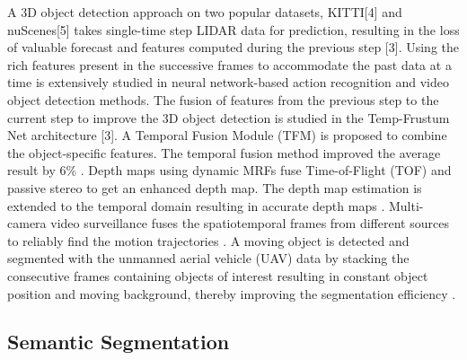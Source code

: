 	A 3D object detection approach on two popular datasets, KITTI[4] and nuScenes[5] takes single-time step LIDAR data for prediction, resulting in the loss of valuable forecast and features computed during the previous step [3]. Using the rich features present in the successive frames to accommodate the past data at a time is extensively studied in neural network-based action recognition \cite{10_han2016seq} \cite{11_kang2017t} \cite{12_ning2017spatially} \cite{13_lu2020retinatrack} and video object detection \cite{14_kopuklu2019you} \cite{15_feichtenhofer2016convolutional} \cite{16_wang2016temporal} methods. The fusion of features from the previous step to the current step to improve the 3D object detection is studied in the Temp-Frustum Net architecture [3]. A Temporal Fusion Module (TFM) is proposed to combine the object-specific features. The temporal fusion method improved the average result by 6\% \cite{17_erccelik2021temp}. Depth maps using dynamic MRFs fuse Time-of-Flight (TOF) and passive stereo to get an enhanced depth map. The depth map estimation is extended to the temporal domain resulting in accurate depth maps \cite{18_zhu2009spatial}. Multi-camera video surveillance fuses the spatiotemporal frames from different sources to reliably find the motion trajectories \cite{19_wu2003multi}. A moving object is detected and segmented with the unmanned aerial vehicle (UAV) data by stacking the consecutive frames containing objects of interest resulting in constant object position and moving background, thereby improving the segmentation efficiency \cite{20_teutsch2012spatio}.

    \subsection{Semantic Segmentation}
	
